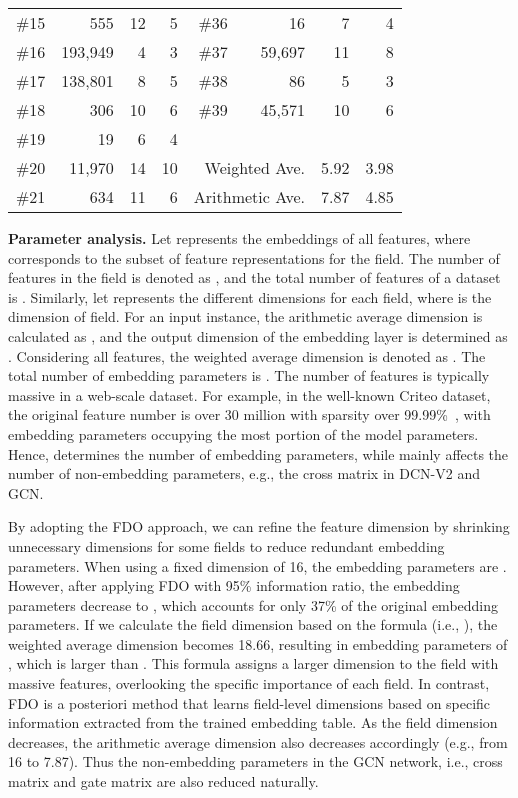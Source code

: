 \documentclass[sigconf]{acmart}
\begin{document}
\begin{table}
{\begin{tabular}{c|rrr c|rrr}
\#15 & 555 & 12 & 5    & \#36 & 16 & 7 & 4 \\
\#16 & 193,949 & 4 & 3  &  \#37 & 59,697 & 11 & 8\\
\#17 & 138,801 & 8 & 5  & \#38 & 86 & 5 & 3 \\
\#18 & 306 & 10 & 6    & \#39 & 45,571 & 10 & 6 \\
\cline{5-8}
\#19 & 19 & 6 & 4       &\multicolumn{4}{c}{}\\
\#20 & 11,970 & 14 & 10 & \multicolumn{2}{r}{Weighted Ave. } & 5.92 & 3.98 \\
\#21 & 634 & 11 & 6    &\multicolumn{2}{r}{Arithmetic Ave. } & 7.87 & 4.85 \\
\hline
\hline
\end{tabular}
}
\end{table}


\textbf{Parameter analysis.}
Let  represents the embeddings of all features, where  corresponds to the subset of feature representations for the  field. The number of features in the  field is denoted as , and the total number of features of a dataset is . Similarly, let  represents the different dimensions for each field, where  is the dimension of  field. For an input instance, the arithmetic average dimension is calculated as , and the output dimension of the embedding layer is determined as . Considering all features, the weighted average dimension is denoted as . The total number of embedding parameters is . The number of features  is typically massive in a web-scale dataset. For example, in the well-known Criteo dataset, the original feature number is over 30 million with sparsity over 99.99\%~\cite{song2019autoint, wang2021masknet}, with embedding parameters occupying the most portion of the model parameters. Hence,  determines the number of embedding parameters, while  mainly affects the number of non-embedding parameters, e.g., the cross matrix  in DCN-V2 and GCN.


By adopting the FDO approach, we can refine the feature dimension by shrinking unnecessary dimensions for some fields to reduce redundant embedding parameters. When using a fixed dimension of 16, the embedding parameters are . However, after applying FDO with 95\% information ratio, the embedding parameters decrease to , which accounts for only 37\% of the original embedding parameters. If we calculate the field dimension based on the formula (i.e., ), the weighted average dimension  becomes 18.66, resulting in embedding parameters of , which is larger than . This formula assigns a larger dimension to the field with massive features, overlooking the specific importance of each field. In contrast, FDO is a posteriori method that learns field-level dimensions based on specific information extracted from the trained embedding table. As the field dimension decreases, the arithmetic average dimension  also decreases accordingly (e.g., from 16 to 7.87). Thus the non-embedding parameters in the GCN network, i.e., cross matrix  and gate matrix  are also reduced naturally. 
\end{document}
